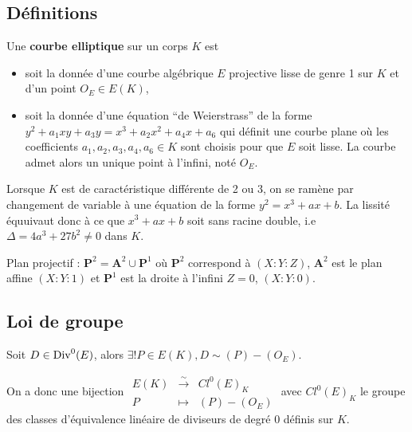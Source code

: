 \subsection{Définitions}

	\begin{defn}
		Une \textbf{courbe elliptique} sur un corps $K$ est 
		\begin{itemize}
			\item[\textbullet] soit la donnée d'une courbe algébrique $E$ projective lisse de genre 1 sur $K$ et d'un point $O_E \in E(K)$,
			\item[\textbullet] soit la donnée d'une équation “de Weierstrass” de la forme $y^2 + a_1 xy + a_3 y = x^3 + a_2 x^2 + a_4 x + a_6$
				qui définit une courbe plane où les coefficients $a_1,a_2,a_3,a_4,a_6 \in K$ sont choisis pour que $E$ soit lisse.
				La courbe admet alors un unique point à l'infini, noté $O_E$.
		\end{itemize}
	\end{defn}
	
	\begin{rem}
		Lorsque $K$ est de caractéristique différente de 2 ou 3, on se ramène par changement de variable à une équation de la forme $y^2 = x^3 + ax + b$.
		La lissité équuivaut donc à ce que $x^3 + ax + b$ soit sans racine double, i.e $\Delta = 4 a^3 + 27 b^2 \neq 0$ dans $K$.
	\end{rem}
	
	Plan projectif : $\mathbf{P}^2 = \mathbf{A}^2 \cup \mathbf{P}^1$ où $\mathbf{P}^2$ correspond à $(X : Y : Z)$, $\mathbf{A}^2$ est le plan affine $(X : Y : 1)$ et $\mathbf{P}^1$ est la droite à l'infini $Z = 0$, $(X : Y : 0)$.


\subsection{Loi de groupe}

	\begin{lem}
		Soit $D \in \operatorname{Div}^0(E)$, alors $\exists ! P \in E(K), D \sim (P) - (O_E)$.
	\end{lem}
	
	On a donc une bijection $\begin{array}{rcl} E(K) & \overset{\sim}{\to} & Cl^0 (E)_K \\ P & \mapsto & (P) - (O_E) \end{array}$ avec $Cl^0 (E)_K$ le groupe des classes d'équivalence linéaire de diviseurs de degré 0 définis sur $K$.
	
